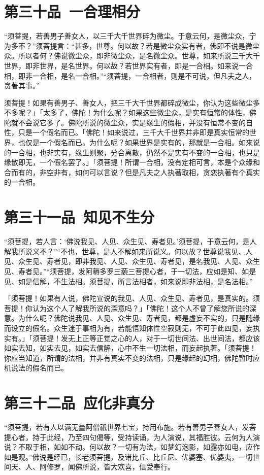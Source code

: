 \documentclass[12pt,twoside,openany]{book}
\newcommand{\kai}[1]{{\CJKfamily{kai}#1}}
\begin{document}
\chapter{第三十品\ 一合理相分}
“须菩提，若善男子善女人，以三千大千世界碎为微尘。于意云何，是微尘众，宁为多不？”须菩提言：“甚多，世尊。何以故？若是微尘众实有者，佛即不说是微尘众。所以者何？佛说微尘众，即非微尘众，是名微尘众。世尊，如来所说三千大千世界，即非世界，是名世界。何以故？若世界实有者，即是一合相。如来说一合相，即非一合相，是名一合相。”“须菩提，一合相者，则是不可说，但凡夫之人，贪著其事。”

\kai{须菩提！如果有善男子、善女人，把三千大千世界都碎成微尘，你认为这些微尘多不多呢？」「太多了，佛陀！为什么呢？如果这些微尘众，是实有恒常的体性，佛陀就不会说它多了。佛陀所说的微尘众，实是缘生的假相，并没有恒常不变的自性，只是一个假名而已。「佛陀！如来说过，三千大千世界并非即是真实恒常的世界，也仅是一个假名而已。为什么呢？如果世界是实有的，那就是一合相。如来说的一合相，也非实有，缘生则聚，分合离散，仍然不是实有不变的一合相，也只是缘散即无，一个假名罢了。」「须菩提！所谓一合相，没有定相可言，本是个众缘和合而有的，非空非有，如何可以言说？但是凡夫之人执著取相，贪恋执著有个真实的一合相。}

\chapter{第三十一品\ 知见不生分}
“须菩提，若人言：‘佛说我见、人见、众生见、寿者见。’须菩提，于意云何，是人解我所说义不？”“不也，世尊，是人不解如来所说义。何以故？世尊说我见、人见、众生见、寿者见，即非我见、人见、众生见、寿者见，是名我见、人见、众生见、寿者见。”“须菩提，发阿耨多罗三藐三菩提心者，于一切法，应如是知、如是见、如是信解，不生法相。须菩提，所言法相者，如来说即非法相，是名法相。”

\kai{「须菩提！如果有人说，佛陀宣说的我见、人见、众生见、寿者见，是真实的。须菩提！你认为这个人了解我所说的深意吗？」「佛陀！这个人不曾了解您所说的深意。为什么呢？佛陀说我见、人见、众生见、寿者见，都是虚妄不实的，只是随缘而设立的假名。众生迷于事相为有，若能悟知体性空寂则无，不可于此四见，妄执实有。」「须菩提！发无上正等正觉之心的人，对于一切世间法、出世间法，都应该如实去知，如实去见，如实去信解，心中不生一切法相，而妄起执著。「须菩提！你应当知道，所谓的法相，并非有真实不变的法相，只是缘起的幻相，佛陀暂时应机说法的假名而已。}

\chapter{第三十二品\ 应化非真分}
“须菩提，若有人以满无量阿僧祇世界七宝，持用布施。若有善男子善女人，发菩提心者，持于此经，乃至四句偈等，受持读诵，为人演说，其福胜彼。云何为人演说？不取于相，如如不动。何以故？{\color{red}一切有为法，如梦幻泡影，如露亦如电，应作如是观。}”佛说是经已，长老须菩提，及诸比丘、比丘尼、优婆塞、优婆夷，一切世间天、人、阿修罗，闻佛所说，皆大欢喜，信受奉行。
\end{document}
